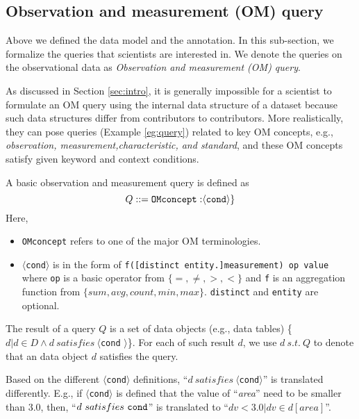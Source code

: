 \subsection{Observation and measurement (OM) query}
Above we defined the data model and the annotation. In this
sub-section, we formalize the queries that scientists are interested
in. We denote the queries on the observational data as {\em Observation
and measurement (OM) query}. 

As discussed in Section \ref{sec:intro}, it is generally impossible for a
scientist to formulate an OM query using the internal data structure
of a dataset because such data structures differ from contributors to
contributors. More realistically, they can pose queries
(Example \ref{eg:query}) related to key OM concepts, e.g., {\em
  observation, measurement,characteristic, and standard}, and these
OM concepts satisfy given keyword and context conditions. 

\begin{definition}\label{def:basic_omq}
A basic observation and measurement query is defined as 
\[Q::={\tt OMconcept:}\langle{\tt cond}\rangle\}\]
Here, 
\begin{itemize}
\item {\tt OMconcept} refers to one of the major OM terminologies. 
\item 
$\langle${\tt cond}$\rangle$ is in the form of 
{\tt f([distinct entity.]measurement) op value} 
where {\tt op} is a basic operator from $\{=, \neq, >, <\}$ 
and {\tt f} is an
aggregation function from $\{sum, avg, count, min, max\}$. 
{\tt distinct} and {\tt entity} are optional. 
\end{itemize}
\end{definition}

\begin{definition}\label{def:qresult}
The result of a query $Q$ is a set of data objects (e.g., data tables) 
\{$d|d\in D \wedge d~satisfies~\langle ${\tt cond} $\rangle$\}. 
For each of such result $d$, we use $d~s.t.~Q$ to denote that
an data object $d$ satisfies the query. 
\end{definition}

Based on the different $\langle${\tt cond}$\rangle$ definitions,
``$d~satisfies~\langle${\tt cond}$\rangle$''
is translated differently. 
E.g., if $\langle${\tt cond}$\rangle$ is defined that the value of ``{\em area}'' need to be
smaller than $3.0$, then, ``$d~satisfies~{\tt cond}$'' is translated to
``$dv<3.0|dv\in d[area]$''.
 
